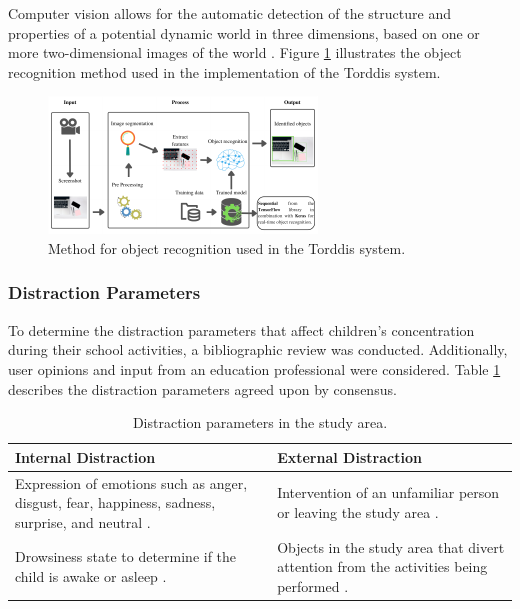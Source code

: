 \documentclass[a4paper,fleqn]{cas-sc}
\begin{document}
				
				Computer vision allows for the automatic detection of the structure and properties of a potential dynamic world in three dimensions, based on one or more two-dimensional images of the world  \citep{Cruz2013}. Figure \ref{fig:ObjectRecognition} illustrates the object recognition method used in the implementation of the Torddis system.
				
				\begin{figure}[hbt!]
					\centering
					\includegraphics[frame,scale=0.5, width=\linewidth]{figs/Figure_3}
					\caption{Method for object recognition used in the Torddis system.\label{fig:ObjectRecognition}}
				\end{figure} 
				
			\subsubsection{Distraction Parameters}
				To determine the distraction parameters that affect children's concentration during their school activities, a bibliographic review was conducted. Additionally, user opinions and input from an education professional were considered. Table \ref{tab:DistractionParameters} describes the distraction parameters agreed upon by consensus.
				
				\begin{table}[hbt!]
					\centering
					\caption{Distraction parameters in the study area. \label{tab:DistractionParameters}}
					\begin{tabular}{p{0.46\textwidth}p{}}
						\hline
						\multicolumn{1}{l}{\rule{0pt}{2.5ex}\textbf{Internal Distraction}} & \multicolumn{1}{l}{\rule{0pt}{2.5ex}\textbf{External Distraction}} \\ \hline
						Expression of emotions such as anger, disgust, fear, happiness, sadness, surprise, and neutral \citep{Asish2022Detecting,Vettivel2018System,Pabba2022AnIntelligent}. & Intervention of an unfamiliar person or leaving the study area \citep{Vettivel2018System}. \\ \hline
						Drowsiness state to determine if the child is awake or asleep \citep{Pabba2022AnIntelligent}. & Objects in the study area that divert attention from the activities being performed \citep{Asish2022Detecting,Pabba2022AnIntelligent}. \\ \hline
					\end{tabular}
				\end{table}
				
\end{document}
